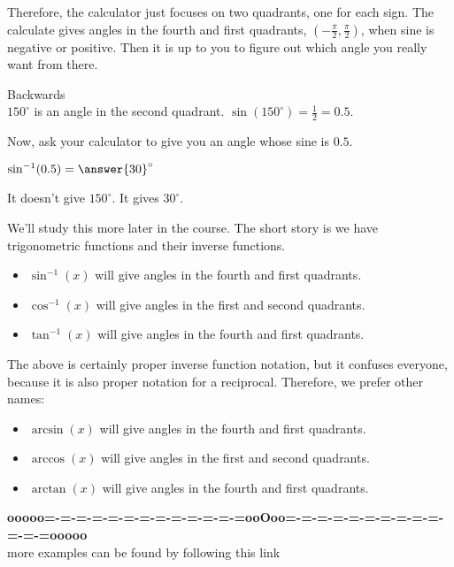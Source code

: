 \documentclass{ximera}
\begin{document}
Therefore, the calculator just focuses on two quadrants, one for each sign.  The calculate gives angles in the fourth  and first quadrants, $\left( -\frac{\pi}{2}, \frac{\pi}{2}   \right)$, when sine is negative or positive.  Then it is up to you to figure out which angle you really want from there.












\begin{question} Backwards \\

$150^{\circ}$ is an angle in the second quadrant. $\sin(150^{\circ}) = \frac{1}{2} = 0.5$.


Now, ask your calculator to give you an angle whose sine is $0.5$.


$\sin^{-1}(0.5) = \answer{30}^{\circ}$


It doesn't give $150^{\circ}$.  It gives $30^{\circ}$.

\end{question}




We'll study this more later in the course.  The short story is we have trigonometric functions and their inverse functions.




\begin{itemize}
\item $\sin^{-1}(x)$ will give angles in the fourth and first quadrants.
\item $\cos^{-1}(x)$ will give angles in the first and second quadrants.
\item $\tan^{-1}(x)$ will give angles in the fourth and first quadrants.
\end{itemize}


The above is certainly proper inverse function notation, but it confuses everyone, because it is also proper notation for a reciprocal.  Therefore, we prefer other names:




\begin{itemize}
\item $\arcsin(x)$ will give angles in the fourth and first quadrants.
\item $\arccos(x)$ will give angles in the first and second quadrants.
\item $\arctan(x)$ will give angles in the fourth and first quadrants.
\end{itemize}





\begin{center}
\textbf{\textcolor{green!50!black}{ooooo=-=-=-=-=-=-=-=-=-=-=-=-=ooOoo=-=-=-=-=-=-=-=-=-=-=-=-=ooooo}} \\

more examples can be found by following this link\\ 

\end{center}
\end{document}
